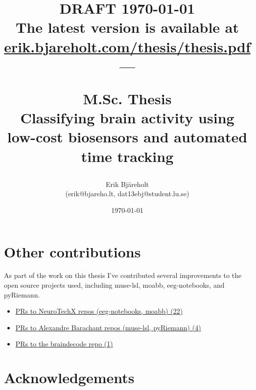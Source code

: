 \documentclass[a4paper]{article}
\title{%
    \small DRAFT \today \\
    \small The latest version is available at \href{https://erik.bjareholt.com/thesis/thesis.pdf}{erik.bjareholt.com/thesis/thesis.pdf}\\
    \large --- \\
    \large \par M.Sc. Thesis\\
    \huge Classifying brain activity using low-cost biosensors and automated time tracking \\
}
\author{Erik Bjäreholt \orcid{0000-0003-1350-9677} \\(erik@bjareho.lt, dat13ebj@student.lu.se)}
\date{\today}
\begin{document}
\maketitle

\begin{abstract}

\end{abstract}

\pagebreak %

\tableofcontents


\pagebreak %

\begin{refsection}


\pagebreak








\section{Other contributions}

    As part of the work on this thesis I've contributed several improvements to the open source projects used, including muse-lsl, moabb, eeg-notebooks, and pyRiemann.

    \begin{itemize}
        \item \href{%
                https://github.com/search?q=org%
            }{PRs to NeuroTechX repos (eeg-notebooks, moabb) (22)}
        \item \href{%
                https://github.com/search?q=org%
            }{PRs to Alexandre Barachant repos (muse-lsl, pyRiemann) (4)}
        \item \href{%
                https://github.com/search?q=org%
            }{PRs to the braindecode repo (1)}
    \end{itemize}

\section*{Acknowledgements}


\end{refsection}
\end{document}
